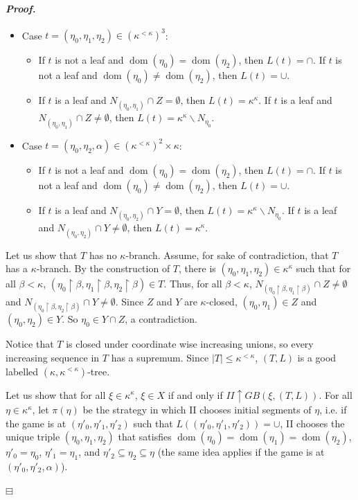 \documentclass[12pt,a4paper]{amsart}
\theoremstyle{definition}
\theoremstyle{remark}
\DeclareMathOperator{\dom}{dom}
\renewcommand{\restriction}{\mathbin\upharpoonright}
\newenvironment{cproof}{\paragraph{\emph{Proof.\,}}}{\hfill{$\boxminus$}\par\vspace{2mm}}
\begin{document}
\begin{cproof}
\begin{itemize}
    \item Case $t=(\eta_0,\eta_1,\eta_2)\in (\kappa^{<\kappa})^3$:
    \begin{itemize}
        \item If $t$ is not a leaf and $\dom(\eta_0)=\dom(\eta_2)$, then $L(t)=\cap$. If $t$ is not a leaf and $\dom(\eta_0)\neq\dom(\eta_2)$, then $L(t)=\cup$.
        \item If $t$ is a leaf and $N_{(\eta_0,\eta_1)}\cap Z=\emptyset$, then $L(t)=\kappa^\kappa$. If $t$ is a leaf and $N_{(\eta_0,\eta_1)}\cap Z\neq\emptyset$, then $L(t)=\kappa^\kappa\backslash N_{\eta_0}$.
    \end{itemize}
    \item Case $t=(\eta_0,\eta_2,\alpha)\in (\kappa^{<\kappa})^2\times\kappa$:
    \begin{itemize}
        \item If $t$ is not a leaf and $\dom(\eta_0)=\dom(\eta_2)$, then $L(t)=\cap$. If $t$ is not a leaf and $\dom(\eta_0)\neq\dom(\eta_2)$, then $L(t)=\cup$.
        \item If $t$ is a leaf and $N_{(\eta_0,\eta_2)}\cap Y=\emptyset$, then $L(t)=\kappa^\kappa\backslash N_{\eta_0}$. If $t$ is a leaf and $N_{(\eta_0,\eta_2)}\cap Y\neq\emptyset$, then $L(t)=\kappa^\kappa$.
    \end{itemize}
\end{itemize}


Let us show that $T$ has no $\kappa$-branch. Assume, for sake of contradiction, that $T$ has a $\kappa$-branch. By the construction of $T$, there is $(\eta_0,\eta_1,\eta_2)\in \kappa^\kappa$ such that for all $\beta<\kappa$, $(\eta_0\restriction\beta,\eta_1\restriction\beta,\eta_2\restriction\beta)\in T$. Thus, for all $\beta<\kappa$, $N_{(\eta_0\restriction\beta,\eta_1\restriction\beta)}\cap Z\neq\emptyset$ and $N_{(\eta_0\restriction\beta,\eta_2\restriction\beta)}\cap Y\neq\emptyset$. Since $Z$ and $Y$ are $\kappa$-closed, $(\eta_0,\eta_1)\in Z$ and $(\eta_0,\eta_2)\in Y$. So $\eta_0\in Y\cap Z$, a contradiction. 

Notice that $T$ is closed under coordinate wise increasing unions, so every increasing sequence in $T$ has a supremum. Since $|T|\leq\kappa^{<\kappa}$, $(T,L)$ is a good labelled $(\kappa,\kappa^{<\kappa})$-tree.

Let us show that for all $\xi\in \kappa^\kappa$, $\xi\in X$ if and only if $II\uparrow GB(\xi,(T,L))$. For all $\eta\in\kappa^\kappa$, let $\pi(\eta)$ be the strategy in which II chooses initial segments of $\eta$, i.e. if the game is at $(\eta'_0,\eta'_1,\eta'_2)$ such that $L((\eta'_0,\eta'_1,\eta'_2))=\cup$, II chooses the unique triple $(\eta_0,\eta_1,\eta_2)$ that satisfies $\dom(\eta_0)=\dom(\eta_1)=\dom(\eta_2)$, $\eta'_0=\eta_0$, $\eta'_1=\eta_1$, and $\eta'_2\subseteq\eta_2\subseteq \eta$ (the same idea applies if the game is at $(\eta'_0,\eta'_2,\alpha)$).


\end{cproof}
\end{document}

